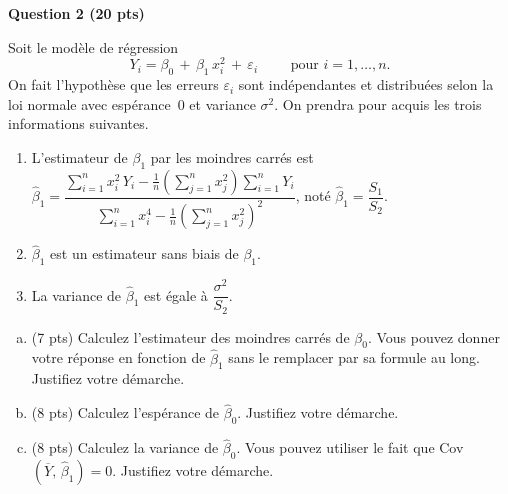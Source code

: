 \documentclass[letter, 11pt]{article}
\begin{document}
\newpage

\textbf{Question 2 (20 pts)} 

Soit le modèle de régression
$$
Y_i = \beta_0\,+\,\beta_1\, x_i^2 \,+\, \varepsilon_i\qquad \text{ pour } i=1,\ldots,n.
$$
On fait l'hypothèse que les erreurs $\varepsilon_i$ sont indépendantes et distribuées selon la loi normale avec espérance~0 et variance $\sigma^2$. On prendra pour acquis les trois informations suivantes.

\begin{enumerate}[$\bullet$]\itemsep 3mm
\item L'estimateur de $\beta_1$ par les moindres carrés est $\hat\beta_1= \dfrac{\sum\limits_{i=1}^n x_i^2\,Y_i - \frac{1}{n}\left(\sum\limits_{j=1}^nx_j^2\right)\sum\limits_{i=1}^n Y_i}{\sum\limits_{i=1}^n x_i^4-\frac{1}{n}\left(\sum\limits_{j=1}^nx_j^2\right)^2}$, noté $\hat\beta_1= \dfrac{S_1}{S_2}$.
\item $\hat\beta_1$ est un estimateur sans biais de $\beta_1$.
\item La variance de $\hat\beta_1$ est égale à $\dfrac{\sigma^2}{S_2}$. %
\end{enumerate}


\begin{enumerate}[(a)]
\item  (7 pts) Calculez l'estimateur des moindres carrés de $\beta_0$. Vous pouvez donner votre réponse en fonction de $\hat\beta_1$ sans le remplacer par sa formule au long. Justifiez votre démarche.
\item (8 pts) Calculez l'espérance de $\hat\beta_0$. Justifiez votre démarche.
\item (8 pts)  Calculez la variance de $\hat\beta_0$. Vous pouvez utiliser le fait que Cov$(\overline Y,\,\hat\beta_1)=0$. Justifiez votre démarche.
\end{enumerate}
\end{document}
